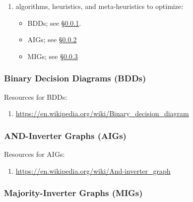 \begin{enumerate}
\begin{enumerate}
\begin{enumerate}
		\item algorithms, heuristics, and meta-heuristics to optimize: \vspace{-0.1cm}
			\begin{itemize} \itemsep -1pt
			\item BDDs; see \S\ref{sssec:BinaryDecisionDiagramsBDDs}.
			\item AIGs; see \S\ref{sssec:ANDInverterGraphsAIGs}
			\item MIGs; see \S\ref{sssec:MajorityInverterGraphsMIGs}
			\end{itemize}
		\end{enumerate}
	\end{enumerate}
\end{enumerate}











\subsubsection{Binary Decision Diagrams (BDDs)}
\label{sssec:BinaryDecisionDiagramsBDDs}


Resources for BDDs: \vspace{-0.3cm}
\begin{enumerate} \itemsep -4pt
\item \url{https://en.wikipedia.org/wiki/Binary_decision_diagram}
\end{enumerate}



\subsubsection{AND-Inverter Graphs (AIGs)}
\label{sssec:ANDInverterGraphsAIGs}




Resources for AIGs: \vspace{-0.3cm}
\begin{enumerate} \itemsep -4pt
\item \url{https://en.wikipedia.org/wiki/And-inverter_graph}
\end{enumerate}



\subsubsection{Majority-Inverter Graphs (MIGs)}
\label{sssec:MajorityInverterGraphsMIGs}




